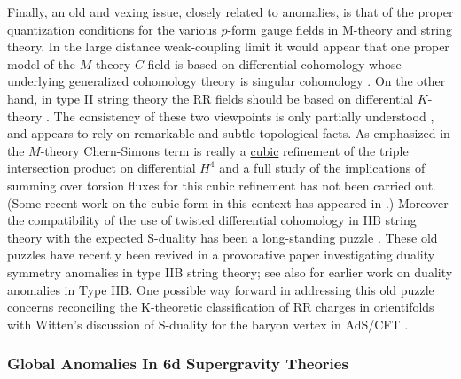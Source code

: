 \documentclass[12pt]{article}
\begin{document}
Finally, an old and vexing issue, closely related to anomalies, is that of the proper quantization
conditions for the various $p$-form gauge fields in M-theory and
string theory. In the large distance weak-coupling limit it would
appear that one proper model of the $M$-theory $C$-field is based on
differential cohomology whose underlying generalized cohomology theory is   
singular cohomology \cite{Diaconescu:2003bm}. On the other hand, 
in type II string theory the RR fields should be based on differential $K$-theory
\cite{Minasian:1997mm,Witten:1998cd,Witten:2000cn,Freed:2000ta,Freed:2006ya,Freed:2006yc}.
The consistency of these two viewpoints is only partially understood
\cite{Diaconescu:2000wz,Diaconescu:2000wy}, and appears to rely on
remarkable and subtle topological facts. 
As emphasized in \cite{Diaconescu:2003bm} the $M$-theory Chern-Simons
term is really a \underline{cubic} refinement of the triple intersection
product on differential $H^4$ and a full study of the implications of
summing over torsion fluxes for this cubic refinement has not been
carried out. (Some recent work on the cubic form in this context has appeared in  
\cite{Freed:2019sco,Han:2020lxd}.) Moreover the compatibility of the use of twisted
differential cohomology in IIB string theory with the expected
S-duality has been a long-standing puzzle \cite{Diaconescu:2000wy}.
These old puzzles have
recently been revived in a provocative paper \cite{Debray:2021vob}
investigating duality symmetry anomalies in type IIB string theory; see also \cite{Gaberdiel:1998ui,Mukhi:1998gi,Minasian:2016hoh, Assel:2016wcr,Pantev:2016nze,Tachikawa:2018njr} for earlier work on duality anomalies in Type IIB. One possible way forward in addressing this old puzzle concerns reconciling the K-theoretic classification of RR charges in orientifolds \cite{Distler:2009ri} with Witten's discussion of S-duality for the baryon vertex in AdS/CFT \cite{Witten:1998xy}. 



\subsubsection{Global Anomalies In 6d Supergravity Theories}
\end{document}
